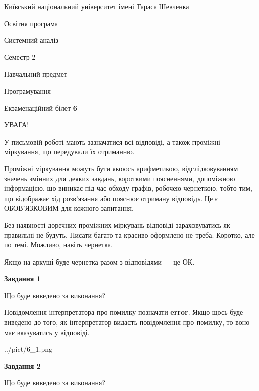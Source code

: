\documentclass[12pt, ukrainian]{article}
\begin{document}
{{\begin {small}\par
{ \center  Київський національний університет імені Тараса Шевченка \par}
{\parbox {5 cm}{Освітня програма \hfill}{\parbox {7 cm}{Системний аналіз \hfill}}\parbox {6 cm}{\hfill Семестр 2}}\par
{\parbox {5 cm} {Навчальний предмет \hfill}\parbox {7 cm}{Програмування \hfill}\parbox {6cm}{\hfill}\par}\vspace{-7pt} \end{small}}{\center Екзаменаційний білет \No \textbf
{ 6 }\par}}
{
\begin {large}
УВАГА!

У письмовій роботі мають зазначатися всі відповіді, а також проміжні міркування, що передували їх отриманню.

Проміжні міркування можуть бути якоюсь арифметикою, відслідковуванням зна\-чень змінних для деяких завдань,
короткими поясненнями, допоміжною інформацією, що виникає під час обходу графів, робочею чернеткою,
тобто тим, що відображає хід розв’язання або пояснює отриману відповідь.
Це є ОБОВ’ЯЗКОВИМ для кожного запитання.

Без наявності доречних проміжних міркувань відповіді зараховуватись як правиль\-ні не будуть.
Писати багато та красиво оформлено не треба. Коротко, але по темі. Можли\-во, навіть чернетка.

Якщо на аркуші буде чернетка разом з відповідями --- це ОК.

\newpage

{\begin {center}\textbf{Завдання 1}\end {center}}\par
Що буде виведено за виконання?

Повідомлення інтерпретатора про помилку позначати \textbf{error}.
Якщо щось буде виведено до того, як інтерпретатор видасть повідомлення про помилку, 
то воно має вказуватись у відповіді. \par


\begin{center}
	{../pict/6_1.png}
\end{center}
\newpage

{\begin {center}\textbf{Завдання 2}\end {center}}\par
Що буде виведено за виконання?


\end{large}}
\end{document}
